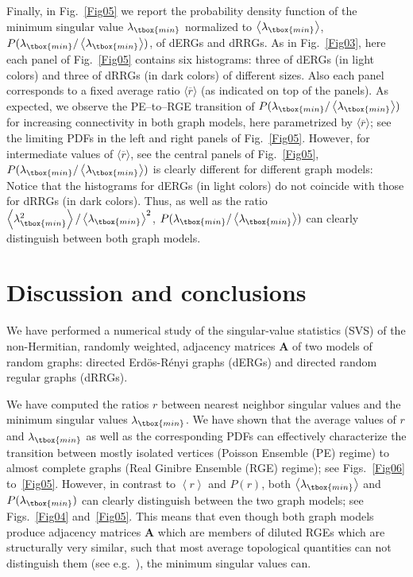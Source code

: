 Finally, in Fig.~\ref{Fig05} we report the probability density function of the minimum singular value 
$\lambda_{\tbox{min}}$ normalized to $\left\langle \lambda_{\tbox{min}} \right\rangle$, 
$P(\lambda_{\tbox{min}}/\left\langle \lambda_{\tbox{min}} \right\rangle)$, of dERGs and dRRGs.
As in Fig.~\ref{Fig03}, here each panel of Fig.~\ref{Fig05} contains six histograms: three of dERGs 
(in light colors) and three of dRRGs (in dark colors) of different sizes. Also each panel corresponds 
to a fixed average ratio $\langle \overline{r}\rangle$ (as indicated on top of the panels).
As expected, we observe the PE--to--RGE transition of 
$P(\lambda_{\tbox{min}}/\left\langle \lambda_{\tbox{min}} \right\rangle)$ for increasing  
connectivity in both graph models, here parametrized by $\langle \overline{r}\rangle$; see the
limiting PDFs in the left and right panels of Fig.~\ref{Fig05}.
However, for intermediate values of $\langle \overline{r}\rangle$, see the central panels of Fig.~\ref{Fig05},
$P(\lambda_{\tbox{min}}/\left\langle \lambda_{\tbox{min}} \right\rangle)$ is clearly different
for different graph models: Notice that the histograms for dERGs (in light colors) do not coincide
with those for dRRGs (in dark colors). Thus, as well as the ratio 
$\left\langle \lambda_{\tbox{min}}^2 \right\rangle/\left\langle \lambda_{\tbox{min}} \right\rangle^2$,
$P(\lambda_{\tbox{min}}/\left\langle \lambda_{\tbox{min}} \right\rangle)$ can clearly distinguish between 
both graph models.





\section{Discussion and conclusions}

We have performed a numerical study of the singular-value statistics (SVS) of the non-Hermitian, randomly 
weighted, adjacency matrices $\mathbf{A}$ of two models of random graphs: directed Erd\"os-R\'enyi graphs 
(dERGs) and directed random regular graphs (dRRGs).

We have computed the ratios $r$ between nearest neighbor singular values and the minimum singular 
values $\lambda_{\tbox{min}}$. We have shown that the average values of $r$ and $\lambda_{\tbox{min}}$ 
as well as the corresponding PDFs can effectively characterize the transition between mostly isolated vertices 
(Poisson Ensemble (PE) regime) to almost complete graphs (Real Ginibre Ensemble (RGE) regime);
see Figs.~\ref{Fig06} to~\ref{Fig05}.
However, in contrast to $\left\langle r \right\rangle$ and $P(r)$, both 
$\left\langle \lambda_{\tbox{min}} \right\rangle$ and $P(\lambda_{\tbox{min}})$ can clearly distinguish 
between the two graph models; see Figs.~\ref{Fig04} and~\ref{Fig05}.
This means that even though both graph models produce adjacency matrices $\mathbf{A}$ which are 
members of diluted RGEs which are structurally very similar, such that most average topological quantities
can not distinguish them (see e.g.~\cite{AMRS21}), the minimum singular values can.


